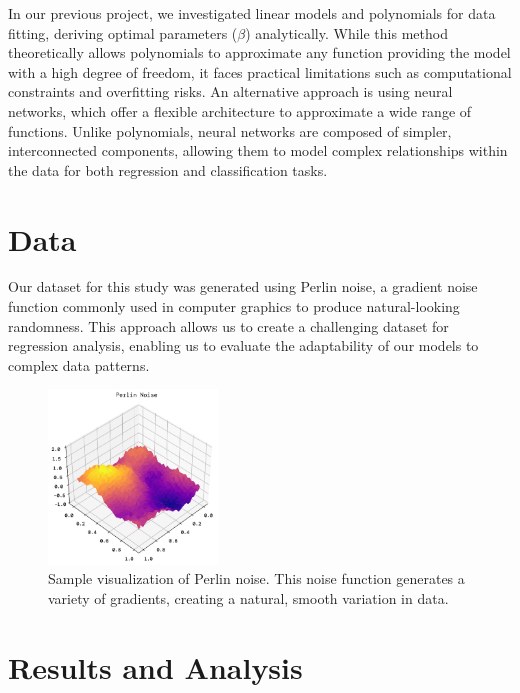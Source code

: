 \documentclass[twoside,11pt]{report}
\begin{document}
    In our previous project\cite{MachineLearningProjects_2023}, we investigated linear models and polynomials 
    for data fitting, deriving optimal parameters (\(\beta\)) analytically. While this method theoretically allows 
    polynomials to approximate any function providing the model with a high degree of freedom, 
    it faces practical limitations such as 
    computational constraints and overfitting risks. An alternative approach is using neural networks, which offer a 
    flexible architecture to approximate a wide range of functions. Unlike polynomials, neural networks are composed 
    of simpler, interconnected components, allowing them to model complex relationships within the data for both 
    regression and classification tasks.


\section*{Data}
    Our dataset for this study was generated using Perlin noise, a gradient noise function commonly used in 
    computer graphics to produce natural-looking randomness. This approach allows us to create a challenging 
    dataset for regression analysis, enabling us to evaluate the adaptability of our models to complex data patterns.

    \begin{figure}[h]
        \begin{center}
            \includegraphics[width=0.4\textwidth]{../runsAndFigures/perlinNoise.png}
        \end{center}
        \caption{Sample visualization of Perlin noise. This noise function generates a variety of gradients, 
        creating a natural, smooth variation in data.}\label{fig:perlin}
    \end{figure}



\newpage
\section*{Results and Analysis}
\label{sec:resultsdiscussion2}
\end{document}
